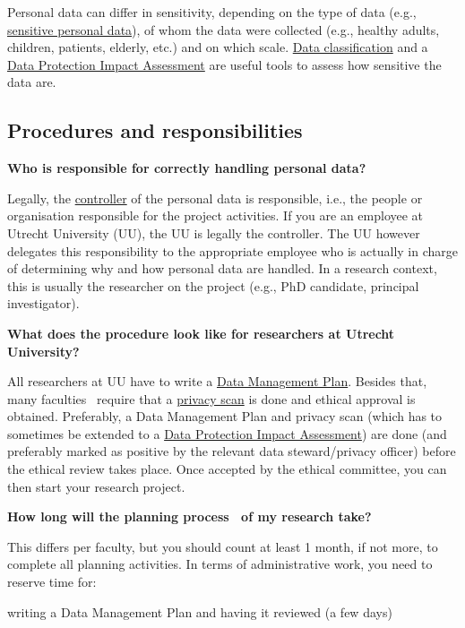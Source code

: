 \documentclass[
]{book}
\begin{document}
Personal data can differ in sensitivity, depending on the type of data (e.g., \protect\hyperlink{special-types-personal-data}{sensitive personal data}), of whom the data were collected (e.g., healthy adults, children, patients, elderly, etc.) and on which scale. \protect\hyperlink{data-classification}{Data classification} and a \protect\hyperlink{dpia}{Data Protection Impact Assessment} are useful tools to assess how sensitive the data are.

\hypertarget{procedures}{%
\subsection{Procedures and responsibilities}\label{procedures}}

\textbf{Who is responsible for correctly handling personal data?}

Legally, the \protect\hyperlink{definitions}{controller} of the personal data is responsible, i.e., the people or organisation responsible for the project activities. If you are an employee at Utrecht University (UU), the UU is legally the controller. The UU however delegates this responsibility to the appropriate employee who is actually in charge of determining why and how personal data are handled. In a research context, this is usually the researcher on the project (e.g., PhD candidate, principal investigator).

\textbf{What does the procedure look like for researchers at Utrecht University?}

All researchers at UU have to write a \href{https://www.uu.nl/en/research/research-data-management/guides/data-management-planning}{Data Management Plan}. Besides that, many faculties ~require that a \protect\hyperlink{privacy-scan}{privacy scan} is done and ethical approval is obtained. Preferably, a Data Management Plan and privacy scan (which has to sometimes be extended to a \protect\hyperlink{dpia}{Data Protection Impact Assessment}) are done (and preferably marked as positive by the relevant data steward/privacy officer) before the ethical review takes place. Once accepted by the ethical committee, you can then start your research project.

\textbf{How long will the planning process ~of my research take?}

This differs per faculty, but you should count at least 1 month, if not more, to complete all planning activities. In terms of administrative work, you need to reserve time for:

writing a Data Management Plan and having it reviewed (a few days)
\end{document}
